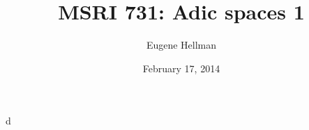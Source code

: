 \documentclass{article}
\title{MSRI 731: Adic spaces 1}
\author{Eugene Hellman}
\date{February 17, 2014}
\begin{document}
\maketitle





d
\end{document}
